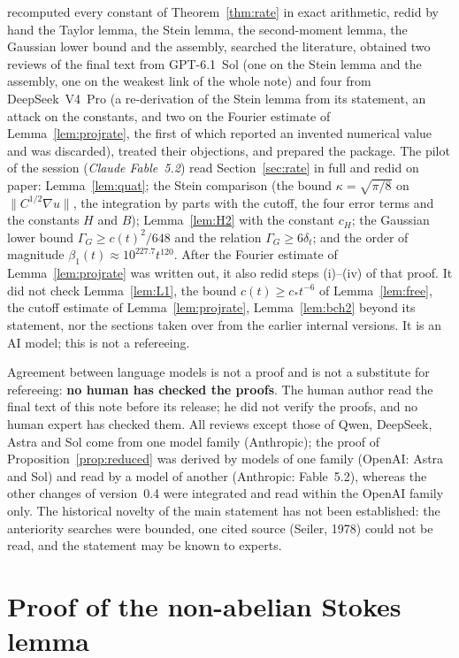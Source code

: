 \documentclass[11pt,a4paper]{article}
\theoremstyle{plain}
\theoremstyle{definition}
\theoremstyle{remark}
\numberwithin{equation}{section}
\begin{document}
\begin{itemize}
recomputed every constant of Theorem~\ref{thm:rate} in exact arithmetic, redid by hand the Taylor lemma, the Stein lemma, the second-moment lemma, the Gaussian lower bound and the assembly, searched the literature, obtained two reviews of the final text from GPT-6.1~Sol (one on the Stein lemma and the assembly, one on the weakest link of the whole note) and four from DeepSeek~V4~Pro (a re-derivation of the Stein lemma from its statement, an attack on the constants, and two on the Fourier estimate of Lemma~\ref{lem:projrate}, the first of which reported an invented numerical value and was discarded), treated their objections, and prepared the package.
The pilot of the session (\emph{Claude Fable~5.2}) read Section~\ref{sec:rate} in full and redid on paper: Lemma~\ref{lem:quat}; the Stein comparison (the bound $\kappa=\sqrt{\pi/8}$ on $\|C^{1/2}\nabla u\|$, the integration by parts with the cutoff, the four error terms and the constants $H$ and $B$); Lemma~\ref{lem:H2} with the constant $c_H$; the Gaussian lower bound $\Gamma_G\ge c(t)^2/648$ and the relation $\Gamma_G\ge6\delta_t$; and the order of magnitude $\beta_1(t)\approx10^{227.7}t^{120}$. After the Fourier estimate of Lemma~\ref{lem:projrate} was written out, it also redid steps (i)--(iv) of that proof. It did not check Lemma~\ref{lem:L1}, the bound $c(t)\ge c_*t^{-6}$ of Lemma~\ref{lem:free}, the cutoff estimate of Lemma~\ref{lem:projrate}, Lemma~\ref{lem:bch2} beyond its statement, nor the sections taken over from the earlier internal versions. It is an AI model; this is not a refereeing.
\end{itemize}
Agreement between language models is not a proof and is not a substitute for
refereeing: \textbf{no human has checked the proofs}. The human author read the final text of this note before its release; he did not verify the proofs, and no human expert has checked them. All reviews except those of Qwen, DeepSeek, Astra and Sol come from one model
family (Anthropic); the proof of Proposition~\ref{prop:reduced} was derived by models of one family (OpenAI: Astra and Sol) and read by a model of
another (Anthropic: Fable~5.2), whereas the other changes of version~0.4 were integrated and read within the OpenAI family only. The historical novelty of the main statement has not been established: the anteriority searches were bounded, one
cited source (Seiler, 1978) could not be read, and the statement may be known to experts.

\appendix
\section{Proof of the non-abelian Stokes lemma}\label{app:stokes}
\end{document}
